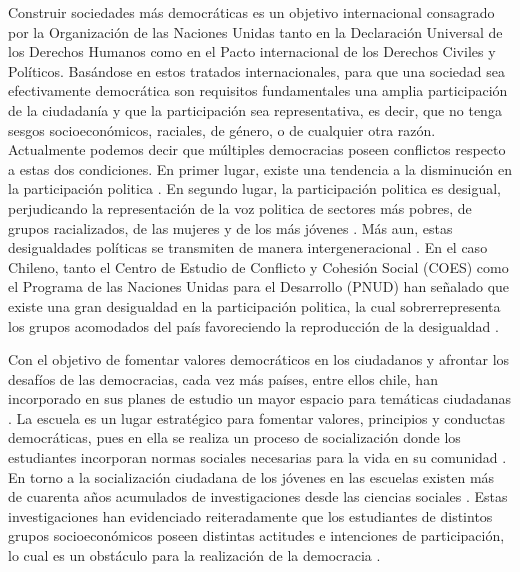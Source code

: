 \documentclass[12pt,twoside]{templates/facsothesis}
\begin{document}
Construir sociedades más democráticas es un objetivo internacional consagrado por la Organización de las Naciones Unidas tanto en la Declaración Universal de los Derechos Humanos como en el Pacto internacional de los Derechos Civiles y Políticos. Basándose en estos tratados internacionales, para que una sociedad sea efectivamente democrática son requisitos fundamentales una amplia participación de la ciudadanía y que la participación sea representativa, es decir, que no tenga sesgos socioeconómicos, raciales, de género, o de cualquier otra razón. Actualmente podemos decir que múltiples democracias poseen conflictos respecto a estas dos condiciones. En primer lugar, existe una tendencia a la disminución en la participación politica \citep{tezanos-pinto_Participacion_2015, herrmann_Disminucion_2016, diaz_Dimensiones_2017, janmaat_Civic_2013, contreras_DIFERENCIAS_2013, galston_Civic_2007}. En segundo lugar, la participación politica es desigual, perjudicando la representación de la voz politica de sectores más pobres, de grupos racializados, de las mujeres y de los más jóvenes \citep{verba_Would_2003, lijphart_Unequal_1997, desposato_Gender_2009, coffe_Explaining_2020, hutchings_CENTRALITY_2004}. Más aun, estas desigualdades políticas se transmiten de manera intergeneracional \citep{brady_Political_2015}. En el caso Chileno, tanto el Centro de Estudio de Conflicto y Cohesión Social (COES) como el Programa de las Naciones Unidas para el Desarrollo (PNUD) han señalado que existe una gran desigualdad en la participación politica, la cual sobrerrepresenta los grupos acomodados del país favoreciendo la reproducción de la desigualdad \citep{joignant_Desigualdades_2017, palet_Desiguales_2017}.

Con el objetivo de fomentar valores democráticos en los ciudadanos y afrontar los desafíos de las democracias, cada vez más países, entre ellos chile, han incorporado en sus planes de estudio un mayor espacio para temáticas ciudadanas \citep{keer_ciudadania_2015}. La escuela es un lugar estratégico para fomentar valores, principios y conductas democráticas, pues en ella se realiza un proceso de socialización donde los estudiantes incorporan normas sociales necesarias para la vida en su comunidad \citep{durkheim_Educacion_2010}. En torno a la socialización ciudadana de los jóvenes en las escuelas existen más de cuarenta años acumulados de investigaciones desde las ciencias sociales \citep{torney_Crossnational_1979}. Estas investigaciones han evidenciado reiteradamente que los estudiantes de distintos grupos socioeconómicos poseen distintas actitudes e intenciones de participación, lo cual es un obstáculo para la realización de la democracia \citep{castillo_Social_2014, miranda_Political_2018, ferrans_Civic_2017, trevino_Influence_2017}.
\end{document}
